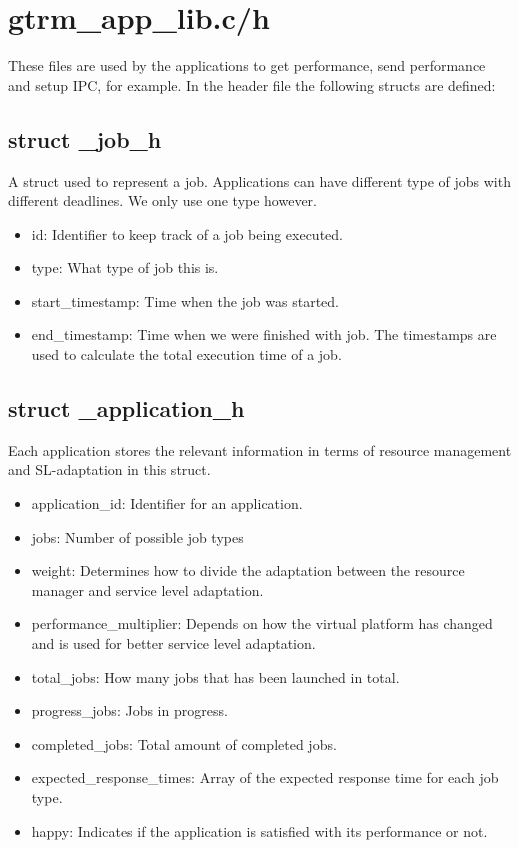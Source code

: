 \documentclass[nobiblatex]{LTHthesis}
\begin{document}
\section{gtrm\_app\_lib.c/h}
These files are used by the applications to get performance, send performance and setup IPC, for example.
In the header file the following structs are defined:
\subsection{struct \_job\_h}
A struct used to represent a job. Applications can have different type of jobs with different deadlines. We only use one type however.
\begin{itemize}
\item id: Identifier to keep track of a job being executed.
\item type: What type of job this is.
\item start\_timestamp: Time when the job was started.
\item end\_timestamp: Time when we were finished with job. The timestamps are used to calculate the total execution time of a job.
\end{itemize}

\subsection{struct \_application\_h}
Each application stores the relevant information in terms of resource management and SL-adaptation in this struct.
\begin{itemize}
\item application\_id: Identifier for an application.
\item jobs: Number of possible job types
\item weight: Determines how to divide the adaptation between the resource manager and service level adaptation.
\item performance\_multiplier: Depends on how the virtual platform has changed and is used for better service level adaptation.
\item total\_jobs: How many jobs that has been launched in total.
\item progress\_jobs: Jobs in progress.
\item completed\_jobs: Total amount of completed jobs.
\item expected\_response\_times: Array of the expected response time for each job type.
\item happy: Indicates if the application is satisfied with its performance or not.
\end{itemize}
\end{document}
